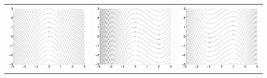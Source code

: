 \newlength{\len}
\setlength{\len}{120pt}
\begin{tabular}{ccc}
\includegraphics[width=\len]{images/module8-figs-6.png}
	& \includegraphics[width=\len]{images/module8-figs-3.png}
	& \includegraphics[width=\len, page=2]{images/module8-figs-2.png} \\

\end{tabular}
